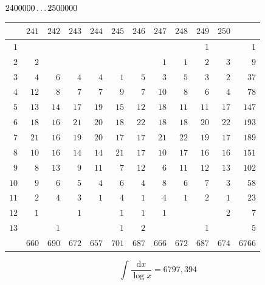 \clearpage
\noindent\begin{minipage}{\linewidth}\centering
{}
\(2400000\mathinner{.\,.\,.}2500000\)\par\smallskip
\begingroup\fontsize{10.5}{11.5}\selectfont\setlength{\tabcolsep}{3.5pt}\renewcommand{\arraystretch}{1}
\begin{tabular}{r|rrrrrrrrrr|r}\hline
 & $241$ & $242$ & $243$ & $244$ & $245$ & $246$ & $247$ & $248$ & $249$ & $250$ &  \\ \hline
$1$ &  &  &  &  &  &  &  &  & $1$ &  & $1$ \\
$2$ & $2$ &  &  &  &  &  & $1$ & $1$ & $2$ & $3$ & $9$ \\
$3$ & $4$ & $6$ & $4$ & $4$ & $1$ & $5$ & $3$ & $5$ & $3$ & $2$ & $37$ \\
$4$ & $12$ & $8$ & $7$ & $7$ & $9$ & $7$ & $10$ & $8$ & $6$ & $4$ & $78$ \\
$5$ & $13$ & $14$ & $17$ & $19$ & $15$ & $12$ & $18$ & $11$ & $11$ & $17$ & $147$ \\
$6$ & $18$ & $16$ & $21$ & $20$ & $18$ & $22$ & $18$ & $18$ & $20$ & $22$ & $193$ \\
$7$ & $21$ & $16$ & $19$ & $20$ & $17$ & $17$ & $21$ & $22$ & $19$ & $17$ & $189$ \\
$8$ & $10$ & $16$ & $14$ & $14$ & $21$ & $17$ & $10$ & $17$ & $16$ & $16$ & $151$ \\
$9$ & $8$ & $13$ & $9$ & $11$ & $7$ & $12$ & $6$ & $11$ & $12$ & $13$ & $102$ \\
$10$ & $9$ & $6$ & $5$ & $4$ & $6$ & $4$ & $8$ & $6$ & $7$ & $3$ & $58$ \\
$11$ & $2$ & $4$ & $3$ & $1$ & $4$ & $1$ & $4$ & $1$ & $2$ & $1$ & $23$ \\
$12$ & $1$ &  & $1$ &  & $1$ & $1$ & $1$ &  &  & $2$ & $7$ \\
$13$ &  & $1$ &  &  & $1$ & $2$ &  &  & $1$ &  & $5$ \\
\hline
 & $660$ & $690$ & $672$ & $657$ & $701$ & $687$ & $666$ & $672$ & $687$ & $674$ & $6766$ \\ \hline
\end{tabular}\par\endgroup
\setlength{\abovedisplayskip}{6pt}\setlength{\belowdisplayskip}{4pt}
\[\int\frac{\mathrm{d}x}{\log x}=6797{,}394\]
\end{minipage}\par

